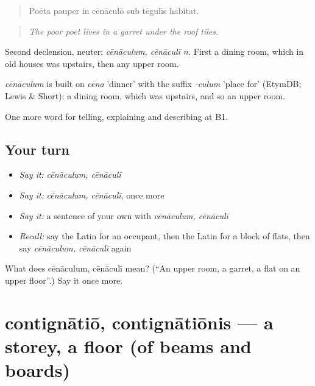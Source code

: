 \begin{quote}
Poēta pauper in cēnāculō sub tēgulīs habitat.
\end{quote}

\begin{quote}
\emph{The poor poet lives in a garret under the roof tiles.}
\end{quote}

Second declension, neuter: \emph{cēnāculum, cēnāculī n.} First a dining room, which in old houses was upstairs, then any upper room.

\begin{cousinweb}
\emph{cēnāculum} is built on \emph{cēna} 'dinner' with the suffix \emph{-culum} 'place for' (EtymDB; Lewis \& Short): a dining room, which was upstairs, and so an upper room.
\end{cousinweb}

\begin{grammarlens}[title={What you've built}]
One more word for telling, explaining and describing at B1.
\end{grammarlens}

\subsection*{Your turn}
\begin{itemize}
\raggedright
  \item \emph{Say it:} \emph{cēnāculum, cēnāculī}
  \item \emph{Say it:} \emph{cēnāculum, cēnāculī}, once more
  \item \emph{Say it:} a sentence of your own with \emph{cēnāculum, cēnāculī}
  \item \emph{Recall:} say the Latin for an occupant, then the Latin for a block of flats, then say \emph{cēnāculum, cēnāculī} again
\end{itemize}

\begin{tcolorbox}[breakable,colback=teal!4,colframe=teal!35!black,title={Before you move on}]
What does cēnāculum, cēnāculī mean? (\textquotedblleft{}An upper room, a garret, a flat on an upper floor\textquotedblright{}.) Say it once more.
\end{tcolorbox}
\section[contignātiō, contignātiōnis]{contignātiō, contignātiōnis — a storey, a floor (of beams and boards)}

